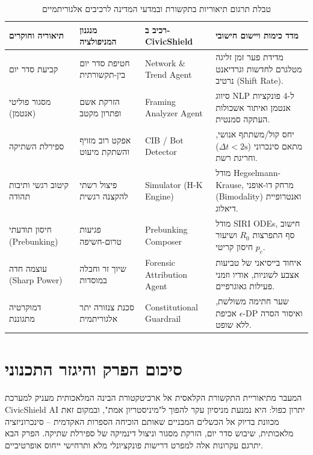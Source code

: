 \begin{table}[htbp]
    \centering
    \caption{טבלת תרגום תיאוריות בתקשורת ובמדעי המדינה לרכיבים אלגוריתמיים}
    \label{tab:theory_mapping}
    \renewcommand{\arraystretch}{1.25}
    \begin{tabular}{|p{3.0cm}|p{3.0cm}|p{3.2cm}|p{4.8cm}|}
        \hline
        \textbf{תיאוריה וחוקרים} & \textbf{מנגנון המניפולציה} & \textbf{רכיב ב-CivicShield} & \textbf{מדד כימות ויישום חישובי} \\
        \hline
        קביעת סדר יום~\cite{mccombs1972agenda} & חטיפת סדר יום בין-תקשורתית & Network \& Trend Agent & מדידת פער זמן זליגה מטלגרם לחדשות וגרדיאנט נרטיב (Shift Rate). \\
        \hline
        מסגור פוליטי (אנטמן)~\cite{entman1993framing} & הזרקת אשם ופתרון מקטב & Framing Analyzer Agent & סיווג NLP ל-4 פונקציות אנטמן ואיתור אשכולות העתקה סמנטית. \\
        \hline
        ספירלת השתיקה~\cite{noelle1974spiral} & אפקט רוב מזויף והשתקת מיעוט & CIB / Bot Detector & יחס קול/משתתף אנושי, מתאם סינכרוני ($\Delta t < 2\text{s}$) וחריגת רשת. \\
        \hline
        קיטוב רגשי ותיבות תהודה~\cite{iyengar2019affective,sunstein2017republic} & פיצול רשתי להקצנה רגשית & Simulator (H-K Engine) & מודל Hegselmann-Krause, מרחק דו-אופני (Bimodality) ואנטרופיית דיאלוג. \\
        \hline
        חיסון תודעתי (Prebunking)~\cite{roozenbeek2022inoculation} & פגיעות טרום-חשיפה & Prebunking Composer & מודל SIRI ODEs, חישוב סף התפרצות $R_0$ ושיעור חיסון קריטי $p_c$. \\
        \hline
        עוצמה חדה (Sharp Power)~\cite{walker2018sharp} & שיוך זר וחבלה במוסדות & Forensic Attribution Agent & איחוד בייסיאני של טביעות אצבע לשוניות, אודיו וזמני פעילות גאוגרפיים. \\
        \hline
        דמוקרטיה מתגוננת~\cite{loewenstein1937militant,barak1988defensive} & סכנת צנזורה יתר אלגוריתמית & Constitutional Guardrail & שער חתימה משולשת, אכיפת $\epsilon$-DP ואיסור הסרה ללא שופט. \\
        \hline
    \end{tabular}
\end{table}

\section{סיכום הפרק והיגזר התכנוני}
המעבר מתיאוריית התקשורת הקלאסית אל ארכיטקטורת הבינה המלאכותית מעניק למערכת CivicShield AI יתרון כפול: היא נמנעת מניסיון עקר להפוך ל"מיניסטריון אמת", ובמקום זאת מכוונת בדיוק אל הכשלים המבניים שאותם הוכיחה הספרות האקדמית -- סינכרוניזציה מלאכותית, שיבוש סדר יום, הזרקת מסגור וניצול דינמיקה של ספירלת שתיקה. הפרק הבא יתרגם עקרונות אלה למפרט דרישות פונקציונלי מלא ותרחישי ייחוס אופרטיביים.
